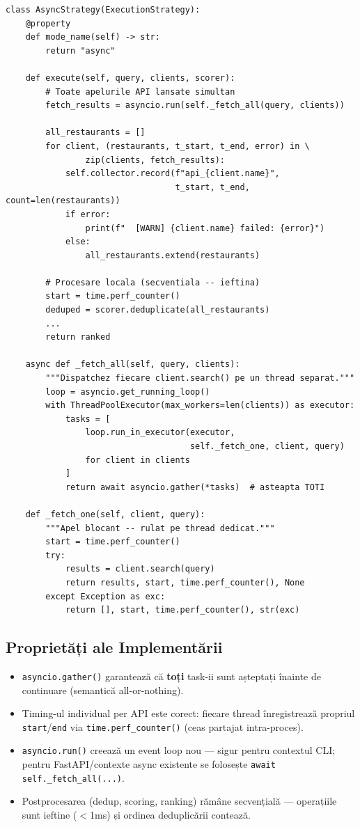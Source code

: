 \documentclass[12pt,a4paper]{article}
\begin{document}
\begin{lstlisting}[caption={AsyncStrategy (execution/async\_strategy.py)}]
class AsyncStrategy(ExecutionStrategy):
    @property
    def mode_name(self) -> str:
        return "async"

    def execute(self, query, clients, scorer):
        # Toate apelurile API lansate simultan
        fetch_results = asyncio.run(self._fetch_all(query, clients))

        all_restaurants = []
        for client, (restaurants, t_start, t_end, error) in \
                zip(clients, fetch_results):
            self.collector.record(f"api_{client.name}",
                                  t_start, t_end, count=len(restaurants))
            if error:
                print(f"  [WARN] {client.name} failed: {error}")
            else:
                all_restaurants.extend(restaurants)

        # Procesare locala (secventiala -- ieftina)
        start = time.perf_counter()
        deduped = scorer.deduplicate(all_restaurants)
        ...
        return ranked

    async def _fetch_all(self, query, clients):
        """Dispatchez fiecare client.search() pe un thread separat."""
        loop = asyncio.get_running_loop()
        with ThreadPoolExecutor(max_workers=len(clients)) as executor:
            tasks = [
                loop.run_in_executor(executor,
                                     self._fetch_one, client, query)
                for client in clients
            ]
            return await asyncio.gather(*tasks)  # asteapta TOTI

    def _fetch_one(self, client, query):
        """Apel blocant -- rulat pe thread dedicat."""
        start = time.perf_counter()
        try:
            results = client.search(query)
            return results, start, time.perf_counter(), None
        except Exception as exc:
            return [], start, time.perf_counter(), str(exc)
\end{lstlisting}

\subsection{Proprietăți ale Implementării}

\begin{itemize}[noitemsep]
  \item \texttt{asyncio.gather()} garantează că \textbf{toți} task-ii sunt așteptați înainte de continuare (semantică all-or-nothing).
  \item Timing-ul individual per API este corect: fiecare thread înregistrează propriul \texttt{start}/\texttt{end} via \texttt{time.perf\_counter()} (ceas partajat intra-proces).
  \item \texttt{asyncio.run()} creează un event loop nou --- sigur pentru contextul CLI; pentru FastAPI/contexte async existente se folosește \texttt{await self.\_fetch\_all(...)}.
  \item Postprocesarea (dedup, scoring, ranking) rămâne secvențială --- operațiile sunt ieftine ($<$1ms) și ordinea deduplicării contează.
\end{itemize}
\end{document}
